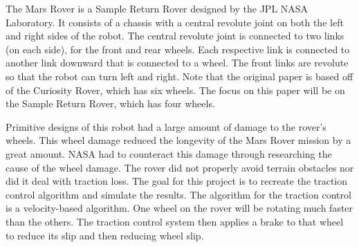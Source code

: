 The Mars Rover is a Sample Return Rover designed by the JPL NASA Laboratory. It consists of a chassis with a central revolute joint on both the left and right sides of the robot. The central revolute joint is connected to two links (on each side),  for the front and rear wheels. Each respective link is connected to another link downward that is connected to a wheel. The front links are revolute so that the robot can turn left and right. Note that the original paper is based off of the Curiosity Rover, which has six wheels. The focus on this paper will be on the Sample Return Rover, which has four wheels. 

Primitive designs of this robot had a large amount of damage to the rover’s wheels. This wheel damage reduced the longevity of the Mars Rover mission by a great amount. NASA had to counteract this damage through researching the cause of the wheel damage. The rover did not properly avoid terrain obstacles nor did it deal with traction loss. The goal for this project is to recreate the traction control algorithm and simulate the results. The algorithm for the traction control is a velocity-based algorithm. One wheel on the rover will be rotating much faster than the others. The traction control system then applies a brake to that wheel to reduce its slip and then reducing wheel slip.


